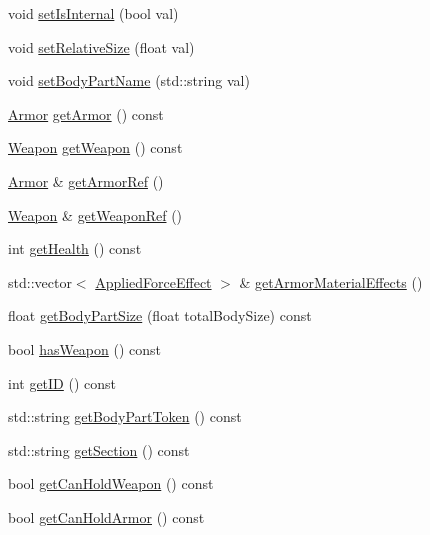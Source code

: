 \begin{DoxyCompactItemize}
\item 
void \mbox{\hyperlink{class_body_part_a6f1b8a920f6c5f7c7f32f51bbf721f6d}{set\+Is\+Internal}} (bool val)
\item 
void \mbox{\hyperlink{class_body_part_ab22b9412b4959e3a0a42efc79e409199}{set\+Relative\+Size}} (float val)
\item 
void \mbox{\hyperlink{class_body_part_a9d3d014b8d645dbbf1ef6c14335ef940}{set\+Body\+Part\+Name}} (std\+::string val)
\item 
\mbox{\hyperlink{class_armor}{Armor}} \mbox{\hyperlink{class_body_part_a84df009b0da129c07a84a50e083f33d8}{get\+Armor}} () const
\item 
\mbox{\hyperlink{class_weapon}{Weapon}} \mbox{\hyperlink{class_body_part_a36ed7476b0b1f17d8f54d87a0553126b}{get\+Weapon}} () const
\item 
\mbox{\hyperlink{class_armor}{Armor}} \& \mbox{\hyperlink{class_body_part_a0398943f64891c99b3a05f20baeccd55}{get\+Armor\+Ref}} ()
\item 
\mbox{\hyperlink{class_weapon}{Weapon}} \& \mbox{\hyperlink{class_body_part_a65b38899cd3805bc1e52253f971c5978}{get\+Weapon\+Ref}} ()
\item 
int \mbox{\hyperlink{class_body_part_a3d5dd1bc03733a80fc0058dcbd6cddd8}{get\+Health}} () const
\item 
std\+::vector$<$ \mbox{\hyperlink{struct_applied_force_effect}{Applied\+Force\+Effect}} $>$ \& \mbox{\hyperlink{class_body_part_a7c4d742811e49a2c97b9bec6c1785e94}{get\+Armor\+Material\+Effects}} ()
\item 
float \mbox{\hyperlink{class_body_part_af6ffb527a93262f5f44eb46e0cc406b8}{get\+Body\+Part\+Size}} (float total\+Body\+Size) const
\item 
bool \mbox{\hyperlink{class_body_part_aeaa4e41c77eb72031f6482ed4d7e5919}{has\+Weapon}} () const
\item 
int \mbox{\hyperlink{class_body_part_a3fd271dfacdd0f34b80e287d532dea64}{get\+ID}} () const
\item 
std\+::string \mbox{\hyperlink{class_body_part_a9768feacb428c5611d0a8f58a0540618}{get\+Body\+Part\+Token}} () const
\item 
std\+::string \mbox{\hyperlink{class_body_part_a1603cca73c99ce6f2f2ca5c73e387594}{get\+Section}} () const
\item 
bool \mbox{\hyperlink{class_body_part_a9982b6e93c9168734960e9f334acdece}{get\+Can\+Hold\+Weapon}} () const
\item 
bool \mbox{\hyperlink{class_body_part_a0be339561a54fa3dbff4ebc27f4b3c4c}{get\+Can\+Hold\+Armor}} () const

\end{DoxyCompactItemize}
